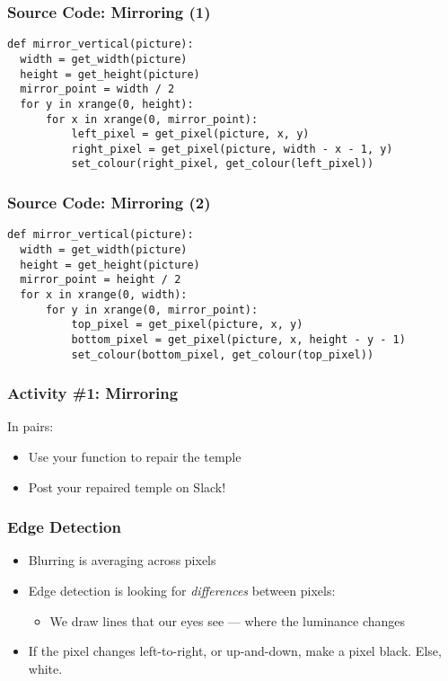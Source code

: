 
\begin{frame}[fragile]
	\frametitle{Source Code: Mirroring (1)}
	
\begin{lstlisting}
def mirror_vertical(picture):
  width = get_width(picture)
  height = get_height(picture)
  mirror_point = width / 2
  for y in xrange(0, height):
      for x in xrange(0, mirror_point):
          left_pixel = get_pixel(picture, x, y)
          right_pixel = get_pixel(picture, width - x - 1, y)
          set_colour(right_pixel, get_colour(left_pixel))
\end{lstlisting}

\end{frame}

\begin{frame}[fragile]
	\frametitle{Source Code: Mirroring (2)}
	
\begin{lstlisting}
def mirror_vertical(picture):
  width = get_width(picture)
  height = get_height(picture)
  mirror_point = height / 2
  for x in xrange(0, width):
      for y in xrange(0, mirror_point):
          top_pixel = get_pixel(picture, x, y)
          bottom_pixel = get_pixel(picture, x, height - y - 1)
          set_colour(bottom_pixel, get_colour(top_pixel))
\end{lstlisting}

\end{frame}

\begin{frame}
	\frametitle{Activity \#1: Mirroring}
	
	In pairs:
	
	\vspace{2em}
	
	\begin{itemize}		
		\item Use your function to repair the temple
		\item Post your repaired temple on Slack!
	\end{itemize}
\end{frame}


\begin{frame}
	\frametitle{Edge Detection}
	
	\begin{itemize}		
		\item Blurring is averaging across pixels
		\item Edge detection is looking for \textit{differences} between pixels:
		\begin{itemize}
			\item We draw lines that our eyes see --- where the luminance changes
		\end{itemize}	
		\item If the pixel changes left-to-right, or up-and-down, make a pixel black. Else, white.
	\end{itemize}
\end{frame}

